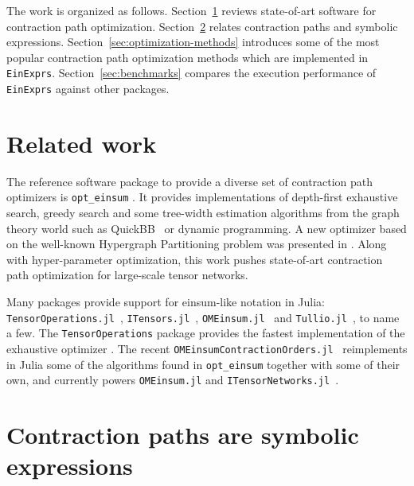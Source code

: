 \documentclass{juliacon}
\begin{document}
The work is organized as follows. Section~\ref{sec:related-work} reviews state-of-art software for contraction path optimization. Section~\ref{sec:symbolic-expr} relates contraction paths and symbolic expressions. Section~\ref{sec:optimization-methods} introduces some of the most popular contraction path optimization methods which are implemented in \texttt{EinExprs}. Section~\ref{sec:benchmarks} compares the execution performance of \texttt{EinExprs} against other packages.

\section{Related work}\label{sec:related-work}
The reference software package to provide a diverse set of contraction path optimizers is \texttt{opt\_einsum} \cite{daniel2018opt}. It provides implementations of depth-first exhaustive search, greedy search and some tree-width estimation algorithms from the graph theory world such as QuickBB~\cite{gogate2012complete} or dynamic programming. A new optimizer based on the well-known Hypergraph Partitioning problem was presented in \cite{gray2021hyper}. Along with hyper-parameter optimization, this work pushes state-of-art contraction path optimization for large-scale tensor networks. 

Many packages provide support for einsum-like notation in Julia: \texttt{TensorOperations.jl}~\cite{devos2023tensoroperations}, \texttt{ITensors.jl}~\cite{fishman2022itensor}, \texttt{OMEinsum.jl}~\cite{omeinsum} and \texttt{Tullio.jl}~\cite{tullio}, to name a few.
The \texttt{TensorOperations} \cite{devos2023tensoroperations} package provides the fastest implementation of the exhaustive optimizer \cite{pfeifer2014faster}.
The recent \texttt{OMEinsumContractionOrders.jl}~\cite{omeinsumcontractionorders} reimplements in Julia some of the algorithms found in \texttt{opt\_einsum} together with some of their own, and currently powers \texttt{OMEinsum.jl} and \texttt{ITensorNetworks.jl}~\cite{itensornetworks}.

\section{Contraction paths are symbolic expressions}\label{sec:symbolic-expr}
\end{document}
